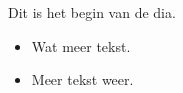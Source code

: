 \documentclass{beamer}
\begin{document}
\begin{frame}

  Dit is \pause het begin \pause van de dia. \pause

  \begin{itemize}
  \item Wat meer tekst. \pause
  \item Meer tekst weer.
  \end{itemize}
\end{frame}
\end{document}
